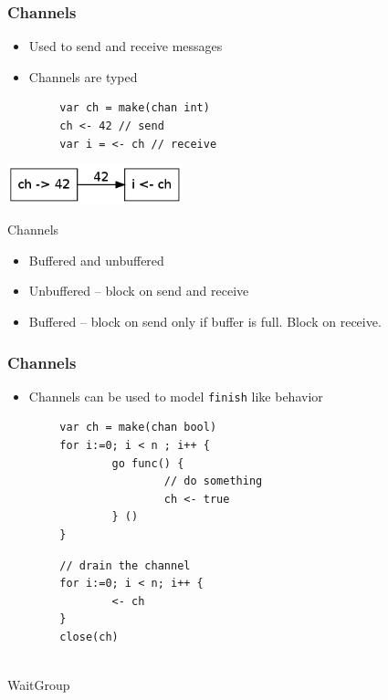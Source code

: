 \documentclass{beamer}
\begin{document}
\begin{frame} [fragile]
\frametitle{Channels}
\begin{itemize}
\item Used to send and receive messages
\item Channels are typed
\end{itemize}
\begin{verbatim}
        var ch = make(chan int) 
        ch <- 42 // send 
        var i = <- ch // receive        
\end{verbatim}
\begin{center}
\includegraphics[width=2in]{channel.png}
\end{center}
\end{frame}

\begin{frame}{Channels}

\begin{itemize}
\item Buffered and unbuffered
\item Unbuffered -- block on send and receive
\item Buffered  -- block on send only if buffer is full. Block on receive.

\end{itemize}
\end{frame}

\begin{frame}[fragile]
\frametitle{Channels}
\begin{itemize}
\item Channels can be used to model \verb=finish= like behavior
\end{itemize}
\begin{verbatim}
        var ch = make(chan bool)
        for i:=0; i < n ; i++ {
                go func() { 
                        // do something
                        ch <- true
                } ()
        }
\end{verbatim}
\pause
\begin{verbatim}
        // drain the channel
        for i:=0; i < n; i++ {
                <- ch
        }
        close(ch)
        
\end{verbatim}
\end{frame}


\begin{frame} {WaitGroup}

\end{frame}
\end{document}
